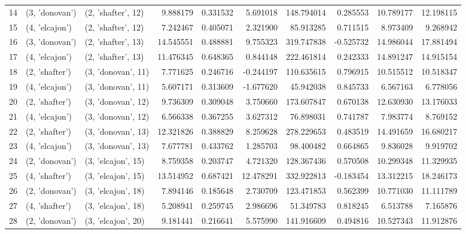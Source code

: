 \begin{tabular}{lllrrrrrrr}
14 &   (3, 'donovan') &  (2, 'shafter', 12) &   9.888179 &  0.331532 &   5.691018 &   148.794014 &  0.285553 &  10.789177 &  12.198115 \\
15 &   (4, 'elcajon') &  (2, 'shafter', 12) &   7.242467 &  0.405071 &   2.321900 &    85.913285 &  0.711515 &   8.973409 &   9.268942 \\
16 &   (3, 'donovan') &  (2, 'shafter', 13) &  14.545551 &  0.488881 &   9.755323 &   319.747838 & -0.525732 &  14.986044 &  17.881494 \\
17 &   (4, 'elcajon') &  (2, 'shafter', 13) &  11.476345 &  0.648365 &   0.844148 &   222.461814 &  0.242333 &  14.891247 &  14.915154 \\
18 &   (2, 'shafter') &  (3, 'donovan', 11) &   7.771625 &  0.246716 &  -0.244197 &   110.635615 &  0.796915 &  10.515512 &  10.518347 \\
19 &   (4, 'elcajon') &  (3, 'donovan', 11) &   5.607171 &  0.313609 &  -1.677620 &    45.942038 &  0.845733 &   6.567163 &   6.778056 \\
20 &   (2, 'shafter') &  (3, 'donovan', 12) &   9.736309 &  0.309048 &   3.750660 &   173.607847 &  0.670138 &  12.630930 &  13.176033 \\
21 &   (4, 'elcajon') &  (3, 'donovan', 12) &   6.566338 &  0.367255 &   3.627312 &    76.898031 &  0.741787 &   7.983774 &   8.769152 \\
22 &   (2, 'shafter') &  (3, 'donovan', 13) &  12.321826 &  0.388829 &   8.259628 &   278.229653 &  0.483519 &  14.491659 &  16.680217 \\
23 &   (4, 'elcajon') &  (3, 'donovan', 13) &   7.677781 &  0.433762 &   1.285703 &    98.400482 &  0.664865 &   9.836028 &   9.919702 \\
24 &   (2, 'donovan') &  (3, 'elcajon', 15) &   8.759358 &  0.203747 &   4.721320 &   128.367436 &  0.570508 &  10.299348 &  11.329935 \\
25 &   (4, 'shafter') &  (3, 'elcajon', 15) &  13.514952 &  0.687421 &  12.478291 &   332.922813 & -0.183454 &  13.312215 &  18.246173 \\
26 &   (2, 'donovan') &  (3, 'elcajon', 18) &   7.894146 &  0.185648 &   2.730709 &   123.471853 &  0.562399 &  10.771030 &  11.111789 \\
27 &   (4, 'shafter') &  (3, 'elcajon', 18) &   5.208941 &  0.259745 &   2.986696 &    51.349783 &  0.818245 &   6.513788 &   7.165876 \\
28 &   (2, 'donovan') &  (3, 'elcajon', 20) &   9.181441 &  0.216641 &   5.575990 &   141.916609 &  0.494816 &  10.527343 &  11.912876 \\

\end{tabular}
